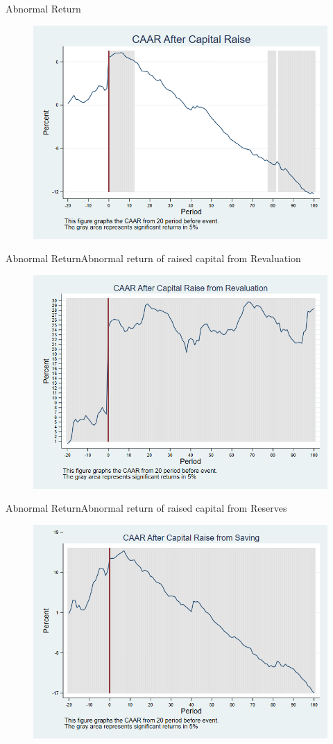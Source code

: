 \documentclass{beamer}
\begin{document}
\begin{frame}{Abnormal Return}
	\label{car_marketindustry}
	\begin{figure}
		\centering
		\includegraphics[width=0.7\linewidth]{Output/car_marketindustry.png}
		\label{fig:car_marketindustry}
	\end{figure}
\end{frame}

\begin{frame}{Abnormal Return}{Abnormal return of raised capital from Revaluation}
	\label{car_marketindustryRevaluation}
	\begin{figure}
		\centering
		\includegraphics[width=0.65\linewidth]{Output/car_marketindustryRevaluation}
		\label{fig:car_markeindustryindustrytRevaluation}
	\end{figure}
	
\end{frame}


\begin{frame}{Abnormal Return}{Abnormal return of raised capital from Reserves}
	\label{car_marketindustrySaving}
	\begin{figure}
		\centering
		\includegraphics[width=0.65\linewidth]{Output/car_marketindustrySaving}
		\label{fig:car_marketindustrySaving}
	\end{figure}
	
\end{frame}
\end{document}
